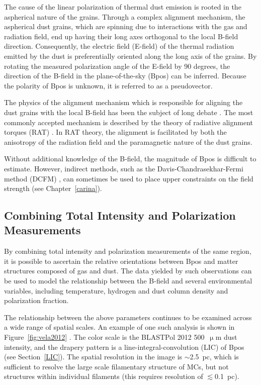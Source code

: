 The cause of the linear polarization of thermal dust emission is rooted in the aspherical nature of the grains. Through a complex alignment mechanism, the aspherical dust grains, which are spinning due to interactions with the gas and radiation field, end up having their long axes orthogonal to the local B-field direction. Consequently, the electric field (E-field) of the thermal radiation emitted by the dust is preferentially oriented along the long axis of the grains. By rotating the measured polarization angle of the E-field by 90 degrees, the direction of the B-field in the plane-of-the-sky (\gls{Bpos}) can be inferred. Because the polarity of \gls{Bpos} is unknown, it is referred to as a pseudovector.

The physics of the alignment mechanism which is responsible for aligning the dust grains with the local B-field has been the subject of long debate \citep{andersson2015interstellar}. The most commonly accepted mechanism is described by the theory of radiative alignment torques (RAT) \citep{lazarian2007radiative}. In RAT theory, the alignment is facilitated by both the anisotropy of the radiation field and the paramagnetic nature of the dust grains.

Without additional knowledge of the B-field, the magnitude of \gls{Bpos} is difficult to estimate. However, indirect methods, such as the Davis-Chandrasekhar-Fermi method (DCFM) \citep{chandrasekhar1953magnetic}, can sometimes be used to place upper constraints on the field strength (see Chapter~\ref{carina}).

\subsection{Combining Total Intensity and Polarization Measurements}

By combining total intensity and polarization measurements of the same region, it is possible to ascertain the relative orientations between \gls{Bpos} and matter structures composed of gas and dust. The data yielded by such observations can be used to model the relationship between the B-field and several environmental variables, including temperature, hydrogen and dust column density and polarization fraction.

The relationship between the above parameters continues to be examined across a wide range of spatial scales. An example of one such analysis is shown in Figure~\ref{fig:vela2012} \citep{fissel2016balloon}. The color scale is the BLASTPol 2012 500~$\upmu$m dust intensity, and the drapery pattern is a line-integral-convolution (LIC) of \gls{Bpos} (see Section~\ref{LIC}). The spatial resolution in the image is $\sim$2.5~pc, which is sufficient to resolve the large scale filamentary structure of MCs, but not structures within individual filaments (this requires resolution of $\lesssim$0.1~pc).


